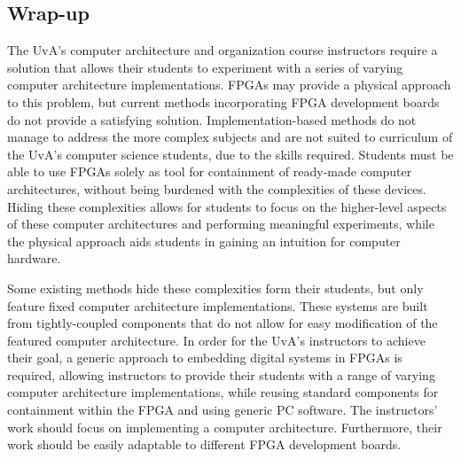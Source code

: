 \documentclass[openright]{template/uva-bachelor-thesis}
\begin{document}
\subsection{Wrap-up}
The UvA's computer architecture and organization course instructors require a solution that allows their students to experiment with a series of varying computer architecture implementations. FPGAs may provide a physical approach to this problem, but current methods incorporating FPGA development boards do not provide a satisfying solution. Implementation-based methods do not manage to address the more complex subjects and are not suited to curriculum of the UvA's computer science students, due to the skills required. Students must be able to use FPGAs solely as tool for containment of ready-made computer architectures, without being burdened with the complexities of these devices. Hiding these complexities allows for students to focus on the higher-level aspects of these computer architectures and performing meaningful experiments, while the physical approach aids students in gaining an intuition for computer hardware.

Some existing methods hide these complexities form their students, but only feature fixed computer architecture implementations. These systems are built from tightly-coupled components that do not allow for easy modification of the featured computer architecture. In order for the UvA's instructors to achieve their goal, a generic approach to embedding digital systems in FPGAs is required, allowing instructors to provide their students with a range of varying computer architecture implementations, while reusing standard components for containment within the FPGA and using generic PC software. The instructors' work should focus on implementing a computer architecture. Furthermore, their work should be easily adaptable to different FPGA development boards.






\end{document}
